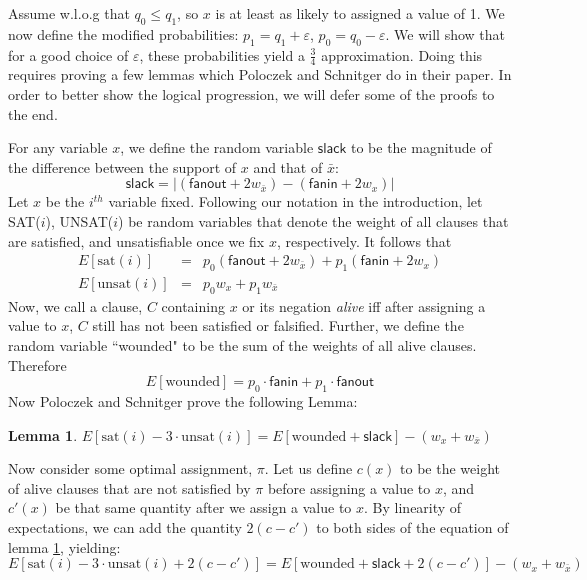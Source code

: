 \documentclass[11pt,letter]{article}
\newtheorem{lemma}[theorem]{Lemma}
\numberwithin{theorem}{section}
\begin{document}
Assume w.l.o.g that $q_0 \le q_1$, so $x$ is at least as likely to assigned a value of 1. We now define the modified probabilities: $p_1 = q_1 + \varepsilon$, $p_0 = q_0 - \varepsilon$. We will show that for a good choice of $\varepsilon$, these probabilities yield a $\frac{3}{4}$ approximation. Doing this requires proving a few lemmas which Poloczek and Schnitger do in their paper. In order to better show the logical progression, we will defer some of the proofs to the end.

For any variable $x$, we define the random variable $\mathsf{slack}$ to be the magnitude of the difference between the support of $x$ and that of $\bar{x}$:
\begin{equation}
\mathsf{slack} = |(\mathsf{fanout} + 2w_{\bar{x}}) -(\mathsf{fanin} + 2w_x)|
\end{equation}
Let $x$ be the $i^{th}$ variable fixed. Following our notation in the introduction, let SAT($i$), UNSAT($i$) be random variables that denote the weight of all clauses that are satisfied, and unsatisfiable once we fix $x$, respectively. It follows that
\begin{eqnarray}
E[\textrm{sat}(i)] &=& p_0(\mathsf{fanout} + 2w_{\bar{x}}) + p_1(\mathsf{fanin} + 2w_{x})\\
E[\textrm{unsat}(i)] &=& p_0w_x + p_1w_{\bar{x}}
\end{eqnarray}
Now, we call a clause, $C$ containing $x$ or its negation \textit{alive} iff after assigning a value to $x$, $C$ still has not been satisfied or falsified. Further, we define the random variable ``wounded" to be the sum of the weights of all alive clauses. Therefore
\begin{equation}
E[\textrm{wounded}] = p_0 \cdot \mathsf{fanin} + p_1 \cdot \mathsf{fanout}
\end{equation}
Now Poloczek and Schnitger prove the following Lemma:
\begin{lemma} \label{L:2}
$E[\textrm{sat}(i) - 3\cdot\textrm{unsat}(i)] = E[\textrm{wounded} + \mathsf{slack}] - (w_x + w_{\bar{x}})$
\end{lemma}
Now consider some optimal assignment, $\pi$. Let us define $c(x)$ to be the weight of alive clauses that are not satisfied by $\pi$ before assigning a value to $x$, and $c'(x)$ be that same quantity after we assign a value to $x$. By linearity of expectations, we can add the quantity $2(c-c')$ to both sides of the equation of lemma \ref{L:2}, yielding:
\begin{equation}
E[\textrm{sat}(i) - 3\cdot\textrm{unsat}(i)+ 2(c-c')] = E[\textrm{wounded} + \mathsf{slack} + 2(c-c')] - (w_x + w_{\bar{x}})
\end{equation}
\end{document}
